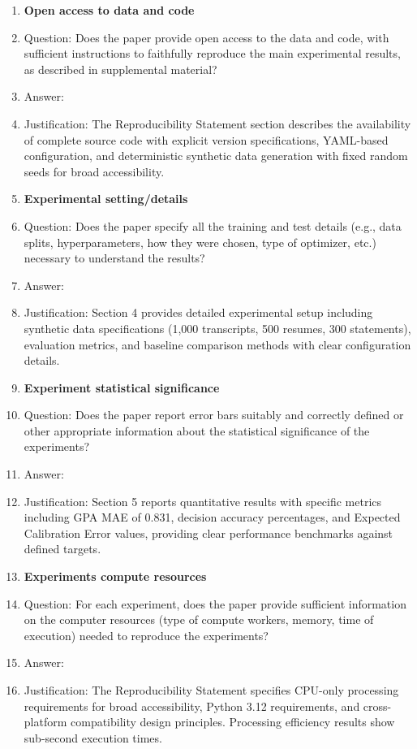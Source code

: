 \documentclass{article}
\begin{document}
\begin{enumerate}
\item {\bf Open access to data and code}
    \item[] Question: Does the paper provide open access to the data and code, with sufficient instructions to faithfully reproduce the main experimental results, as described in supplemental material?
    \item[] Answer: \answerYes{}
    \item[] Justification: The Reproducibility Statement section describes the availability of complete source code with explicit version specifications, YAML-based configuration, and deterministic synthetic data generation with fixed random seeds for broad accessibility.

\item {\bf Experimental setting/details}
    \item[] Question: Does the paper specify all the training and test details (e.g., data splits, hyperparameters, how they were chosen, type of optimizer, etc.) necessary to understand the results?
    \item[] Answer: \answerYes{}
    \item[] Justification: Section 4 provides detailed experimental setup including synthetic data specifications (1,000 transcripts, 500 resumes, 300 statements), evaluation metrics, and baseline comparison methods with clear configuration details.

\item {\bf Experiment statistical significance}
    \item[] Question: Does the paper report error bars suitably and correctly defined or other appropriate information about the statistical significance of the experiments?
    \item[] Answer: \answerYes{}
    \item[] Justification: Section 5 reports quantitative results with specific metrics including GPA MAE of 0.831, decision accuracy percentages, and Expected Calibration Error values, providing clear performance benchmarks against defined targets.

\item {\bf Experiments compute resources}
    \item[] Question: For each experiment, does the paper provide sufficient information on the computer resources (type of compute workers, memory, time of execution) needed to reproduce the experiments?
    \item[] Answer: \answerYes{}
    \item[] Justification: The Reproducibility Statement specifies CPU-only processing requirements for broad accessibility, Python 3.12 requirements, and cross-platform compatibility design principles. Processing efficiency results show sub-second execution times.


\end{enumerate}
\end{document}
